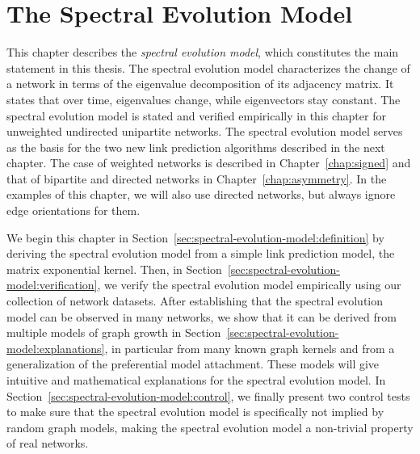 \documentclass[11pt,a4paper]{book}
\begin{document}
\chapter{The Spectral Evolution Model}
\label{chap:spectral-evolution-model}
This chapter describes the \emph{spectral evolution model}, which
constitutes the main statement in this thesis.  The spectral evolution
model characterizes the change of a network in terms of the eigenvalue
decomposition of its adjacency matrix.  It states that over time,
eigenvalues change, while eigenvectors stay constant.  
The spectral evolution model 
is stated and verified empirically in this chapter for unweighted
undirected unipartite networks.  
The spectral evolution model serves as the basis for the two new link
prediction algorithms described in the next chapter.  
The case of 
weighted networks is described in Chapter~\ref{chap:signed} and that of
bipartite and directed networks in Chapter~\ref{chap:asymmetry}.  In the
examples of this chapter, we will also use directed networks,
but always ignore edge orientations for them.  

We begin this chapter in
Section~\ref{sec:spectral-evolution-model:definition} by deriving the
spectral evolution model from a simple link prediction model, the matrix
exponential kernel.  Then, in
Section~\ref{sec:spectral-evolution-model:verification}, we verify
the spectral evolution model empirically using our collection of network
datasets. 
After establishing that the spectral evolution model can be
observed in many networks, we show that it can be derived from
multiple models of graph growth in
Section~\ref{sec:spectral-evolution-model:explanations}, in particular
from many known graph kernels and from a generalization of the
preferential model attachment.  
These models will give intuitive and mathematical explanations for the
spectral evolution model. 
In Section~\ref{sec:spectral-evolution-model:control}, we
finally present two control tests to make sure that the spectral 
evolution model is specifically not implied by random graph models,
making the spectral evolution model a non-trivial property of real
networks.
\end{document}
